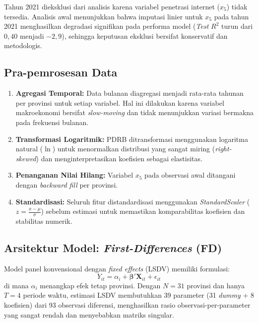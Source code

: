 \documentclass[12pt,a4paper]{article}
\begin{document}
Tahun 2021 dieksklusi dari analisis karena variabel penetrasi internet ($x_5$) tidak tersedia. Analisis awal menunjukkan bahwa imputasi linier untuk $x_5$ pada tahun 2021 menghasilkan degradasi signifikan pada performa model (\textit{Test} $R^2$ turun dari $0{,}40$ menjadi $-2{,}9$), sehingga keputusan eksklusi bersifat konservatif dan metodologis.

\subsection{Pra-pemrosesan Data}

\begin{enumerate}
\item \textbf{Agregasi Temporal:} Data bulanan diagregasi menjadi rata-rata tahunan per provinsi untuk setiap variabel. Hal ini dilakukan karena variabel makroekonomi bersifat \textit{slow-moving} dan tidak menunjukkan variasi bermakna pada frekuensi bulanan.
\item \textbf{Transformasi Logaritmik:} PDRB ditransformasi menggunakan logaritma natural ($\ln$) untuk menormalkan distribusi yang sangat miring (\textit{right-skewed}) dan menginterpretasikan koefisien sebagai elastisitas.
\item \textbf{Penanganan Nilai Hilang:} Variabel $x_5$ pada observasi awal ditangani dengan \textit{backward fill} per provinsi.
\item \textbf{Standardisasi:} Seluruh fitur distandardisasi menggunakan \textit{StandardScaler} ($z = \frac{x - \mu}{\sigma}$) sebelum estimasi untuk memastikan komparabilitas koefisien dan stabilitas numerik.
\end{enumerate}

\subsection{Arsitektur Model: \textit{First-Differences} (FD)}

Model panel konvensional dengan \textit{fixed effects} (LSDV) memiliki formulasi:
\begin{equation}
Y_{it} = \alpha_i + \boldsymbol{\beta}' \mathbf{X}_{it} + \epsilon_{it}
\end{equation}
di mana $\alpha_i$ menangkap efek tetap provinsi. Dengan $N = 31$ provinsi dan hanya $T = 4$ periode waktu, estimasi LSDV membutuhkan 39 parameter (31 \textit{dummy} + 8 koefisien) dari 93 observasi diferensi, menghasilkan rasio observasi-per-parameter yang sangat rendah dan menyebabkan matriks singular.
\end{document}
